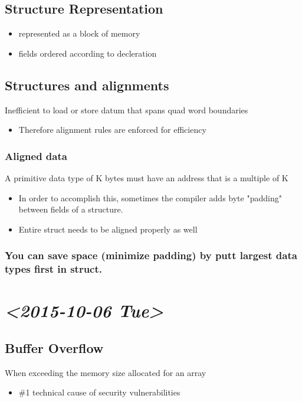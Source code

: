 \documentclass[11pt]{article}
\begin{document}
\subsection{Structure Representation}
\label{sec-9-5}
\begin{itemize}
\item represented as a block of memory
\item fields ordered according to decleration
\end{itemize}
\subsection{Structures and alignments}
\label{sec-9-6}
Inefficient to load or store datum that spans quad word boundaries 
\begin{itemize}
\item Therefore alignment rules are enforced for efficiency
\end{itemize}
\subsubsection{Aligned data}
\label{sec-9-6-1}
A primitive data type of K bytes must have an address that is a multiple of K
\begin{itemize}
\item In order to accomplish this, sometimes the compiler adds byte "padding" between fields of a structure.
\item Entire struct needs to be aligned properly as well
\end{itemize}
\subsubsection{You can save space (minimize padding) by putt largest data types first in struct.}
\label{sec-9-6-2}
\section{\textit{<2015-10-06 Tue>}}
\label{sec-10}
\subsection{Buffer Overflow}
\label{sec-10-1}
When exceeding the memory size allocated for an array
\begin{itemize}
\item \#1 technical cause of security vulnerabilities
\end{itemize}
\end{document}
